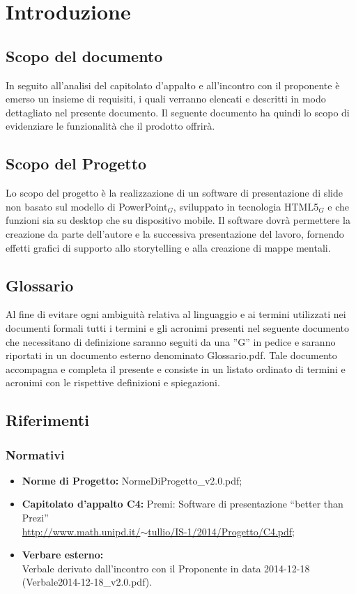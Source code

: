 \section{Introduzione}

\subsection{Scopo del documento}
In seguito all'analisi del capitolato d'appalto e all'incontro con il proponente è emerso un insieme di requisiti, i quali verranno elencati e descritti in modo dettagliato nel presente documento.
Il seguente documento ha quindi lo scopo di evidenziare le funzionalità che il prodotto offrirà.

\subsection{Scopo del Progetto}
Lo scopo del progetto è la realizzazione di un software di presentazione di slide non basato sul modello di PowerPoint$_{G}$, sviluppato in tecnologia HTML5$_{G}$ e che funzioni sia su desktop che su dispositivo mobile. Il software dovrà permettere la creazione da parte dell'autore e la successiva presentazione del lavoro, fornendo effetti grafici di supporto allo storytelling e alla creazione di mappe mentali. 

\subsection{Glossario}
Al fine di evitare ogni ambiguità relativa al linguaggio e ai termini utilizzati nei documenti formali tutti i termini e gli acronimi presenti nel seguente documento che necessitano di definizione saranno seguiti da una ”G” in pedice e saranno riportati in un documento esterno denominato Glossario.pdf. Tale documento accompagna e completa il presente e consiste in un listato ordinato di termini e acronimi con le rispettive definizioni e spiegazioni.

\subsection{Riferimenti}
\subsubsection{Normativi}
\begin{itemize}
	\item \textbf{Norme di Progetto:} NormeDiProgetto\_v2.0.pdf;
	\item \textbf{Capitolato d’appalto C4:} Premi: Software di presentazione ``better than Prezi''\\ \href{http://www.math.unipd.it/~tullio/IS-1/2014/Progetto/C4.pdf}{http://www.math.unipd.it/$\sim$tullio/IS-1/2014/Progetto/C4.pdf};
	\item \textbf{Verbare esterno:} \\ 
		Verbale derivato dall'incontro con il Proponente in data 2014-12-18 (Verbale2014-12-18\_v2.0.pdf).
\end{itemize}

